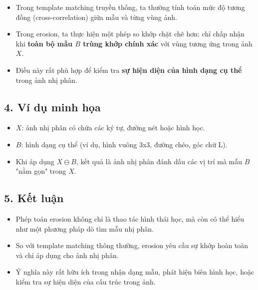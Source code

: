 \documentclass[12pt]{article}
\begin{document}
	 \begin{itemize}
	 \item Trong template matching truyền thống, ta thường tính toán mức độ tương đồng (cross-correlation) giữa mẫu và từng vùng ảnh.
	 \item Trong erosion, ta thực hiện một phép so khớp chặt chẽ hơn: chỉ chấp nhận khi \textbf{toàn bộ mẫu $B$ trùng khớp chính xác} với vùng tương ứng trong ảnh $X$.
	 \item Điều này rất phù hợp để kiểm tra \textbf{sự hiện diện của hình dạng cụ thể} trong ảnh nhị phân.
	 \end{itemize}
	 
	 \subsection*{4. Ví dụ minh họa}
	 
	 \begin{itemize}
	 \item $X$: ảnh nhị phân có chứa các ký tự, đường nét hoặc hình học.
	 \item $B$: hình dạng cụ thể (ví dụ, hình vuông 3x3, đường chéo, góc chữ L).
	 \item Khi áp dụng $X \ominus B$, kết quả là ảnh nhị phân đánh dấu các vị trí mà mẫu $B$ "nằm gọn" trong $X$.
	 \end{itemize}
	 
	 \subsection*{5. Kết luận}
	 
	 \begin{itemize}
	 \item Phép toán erosion không chỉ là thao tác hình thái học, mà còn có thể hiểu như một phương pháp dò tìm mẫu nhị phân.
	 \item So với template matching thông thường, erosion yêu cầu sự khớp hoàn toàn và chỉ áp dụng cho ảnh nhị phân.
	 \item Ý nghĩa này rất hữu ích trong nhận dạng mẫu, phát hiện biên hình học, hoặc kiểm tra sự hiện diện của cấu trúc trong ảnh.
	 \end{itemize}
\end{document}
